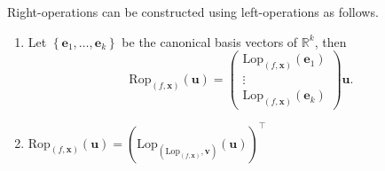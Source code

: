 \begin{proposition}\label{prop:rop_and_lop}
    Right-operations can be constructed using left-operations as follows.
    \begin{enumerate}
        \item Let $\left\{\mathbf{e}_1,\dots,\mathbf{e}_k\right\}$ be the canonical basis vectors of $\mathbb{R}^k$, then $$\mathrm{Rop}_{(f,\mathbf{x})}(\mathbf{u})=\begin{pmatrix}\mathrm{Lop}_{(f,\mathbf{x})}\left(\mathbf{e}_1\right)\\\vdots\\\mathrm{Lop}_{(f,\mathbf{x})}\left(\mathbf{e}_k\right)\end{pmatrix}\mathbf{u}.$$
        \item $\mathrm{Rop}_{(f,\mathbf{x})}(\mathbf{u})=\left(\mathrm{Lop}_{\left(\mathrm{Lop}_{(f,\mathbf{x})},\mathbf{v}\right)}(\mathbf{u})\right)^\top$
    \end{enumerate}
\end{proposition}

